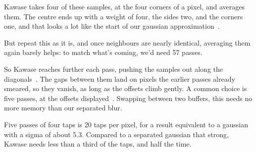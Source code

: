 \documentclass{article}
\begin{document}
Kawase takes four of these samples, at the four corners of a pixel, and averages them. The centre ends up with a weight of four, the sides two, and the corners one, and that looks a lot like the start of our gaussian approximation~\cite{kawase:gdc2003}.

But repeat this as it is, and once neighbours are nearly identical, averaging them again barely helps: to match what's coming, we'd need 57 passes.

So Kawase reaches further each pass, pushing the samples out along the diagonals~\cite{kawase:gdc2003}. The gaps between them land on pixels the earlier passes already smeared, so they vanish, as long as the offsets climb gently. A common choice is five passes, at the offsets displayed~\cite{web:intel-kawase}. Swapping between two buffers, this needs no more memory than our separated blur.

Five passes of four taps is 20 taps per pixel, for a result equivalent to a gaussian with a sigma of about 5.3. Compared to a separated gaussian that strong, Kawase needs less than a third of the taps, and half the time.
\end{document}
